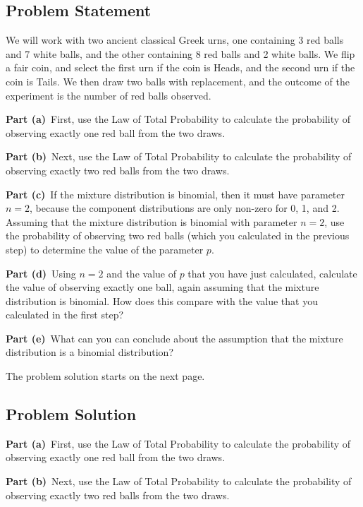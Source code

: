 \documentclass[12pt]{article}
\theoremstyle{definition}
\begin{document}
\subsection*{Problem Statement}

We will work with two ancient classical Greek urns, one containing 3 red balls and 7 white balls, and the other containing 8 red balls and 2 white balls. We flip a fair coin, and select the first urn if the coin is Heads, and the second urn if the coin is Tails. We then draw two balls with replacement, and the outcome of the experiment is the number of red balls observed.

\bigskip
\noindent
{\bf Part (a)}\ First, use the Law of Total Probability to calculate the probability of observing exactly one red ball from the two draws.

\bigskip
\noindent
{\bf Part (b)}\ Next, use the Law of Total Probability to calculate the probability of observing exactly two red balls from the two draws.

\bigskip
\noindent
{\bf Part (c)}\ If the mixture distribution is binomial, then it must have parameter $n = 2$, because the component distributions are only non-zero for 0, 1, and 2. Assuming that the  mixture distribution is binomial with parameter $n = 2$, use the probability of observing two red balls (which you calculated in the previous step) to determine the value of the parameter $p$.

\bigskip
\noindent
{\bf Part (d)}\ Using $n = 2$ and the value of $p$ that you have just calculated, calculate the value of observing exactly one ball, again assuming that the mixture distribution is binomial. How does this compare with the value that you calculated in the first step?

\bigskip
\noindent
{\bf Part (e)}\ What can you can conclude about the assumption that the mixture distribution is a binomial distribution?



\bigskip
\noindent
The problem solution starts on the next page.

\newpage
\subsection*{Problem Solution}

\noindent
{\bf Part (a)}\ First, use the Law of Total Probability to calculate the probability of observing exactly one red ball from the two draws.

\vspace{3.5in}
\noindent
{\bf Part (b)}\ Next, use the Law of Total Probability to calculate the probability of observing exactly two red balls from the two draws.
\end{document}
